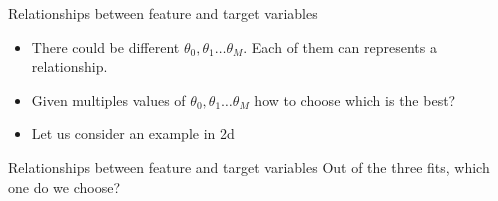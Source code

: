\documentclass{beamer}
\begin{document}
\begin{frame}{Relationships between feature and target variables}
    \begin{itemize}
    	\item  There could be different $\theta_{0}, \theta_{1} \dots \theta_{M}$. Each of them can represents a relationship.
    	\item  Given multiples values of $\theta_{0}, \theta_{1} \dots \theta_{M}$ how to choose which is the  best?
    	\item Let us consider an example in 2d
    \end{itemize}
   
    
   
    
\end{frame}

\begin{frame}{Relationships between feature and target variables}
Out of the three fits, which one do we choose? \vspace{10pt}

\end{frame}
\end{document}
